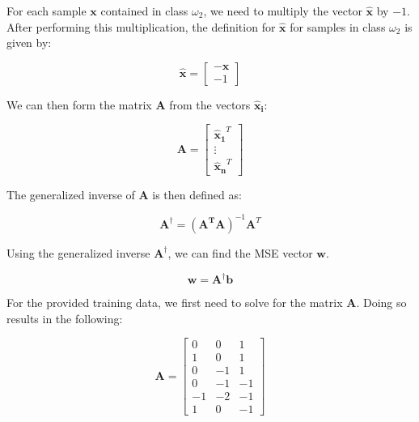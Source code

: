 \documentclass[fleqn]{article}
\begin{document}
\begin{enumerate}
		For each sample $\mathbf{x}$ contained in class $\omega_2$, we need to multiply the vector $\mathbf{\hat{x}}$ by $-1$. After performing this multiplication, the definition for $\mathbf{\hat{x}}$  for samples in class $\omega_2$ is given by:
		
		\begin{equation*}
			\mathbf{\hat{x}} = \begin{bmatrix} -\mathbf{x} \\ -1 \end{bmatrix}			
		\end{equation*}
		
		We can then form the matrix $\mathbf{A}$ from the vectors $\mathbf{\hat{x}_i}$:
		
		\begin{equation*}
			\mathbf{A} = \begin{bmatrix} \mathbf{\hat{x}_1}^T \\ \vdots \\ \mathbf{\hat{x}_n}^T \end{bmatrix}					
		\end{equation*}
		
		The generalized inverse of $\mathbf{A}$ is then defined as:
		
		\begin{equation*}
			\mathbf{A}^{\dag} = (\mathbf{A^T}\mathbf{A})^{-1}\mathbf{A}^T
		\end{equation*}
		
		Using the generalized inverse $\mathbf{A}^{\dag}$, we can find the MSE vector $\mathbf{w}$.
		
		\begin{equation*}
			\mathbf{w} = \mathbf{A}^{\dag}\mathbf{b}
		\end{equation*}
			
		For the provided training data, we first need to solve for the matrix $\mathbf{A}$. Doing so results in the following:
		
		\begin{equation*}
			\mathbf{A} = \begin{bmatrix}
				0  &  0 &  1 \\
				1  &  0 &  1 \\
				0  & -1 &  1 \\
				0  & -1 & -1 \\
			   -1  & -2 & -1 \\
			    1  &  0 & -1
			\end{bmatrix}
		\end{equation*}
		

\end{enumerate}
\end{document}
